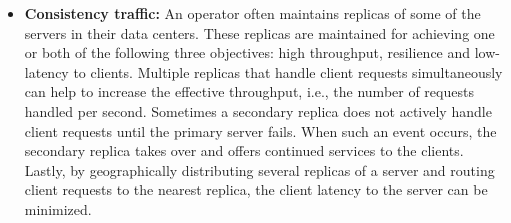 \begin{itemize}
\item \textbf{Consistency traffic:} An operator often maintains replicas of some of the servers in their data centers. These replicas are maintained for achieving one or both of the following three objectives: high throughput, resilience and low-latency to clients. Multiple replicas that handle client requests simultaneously can help to increase the effective throughput, i.e., the number of requests handled per second. Sometimes a secondary replica does not actively handle client requests until the primary server fails. When such an event occurs, the secondary replica takes over and offers continued services to the clients. Lastly, by geographically distributing several replicas of a server and routing client requests to the nearest replica, the client latency to the server can be minimized. 


\end{itemize}
